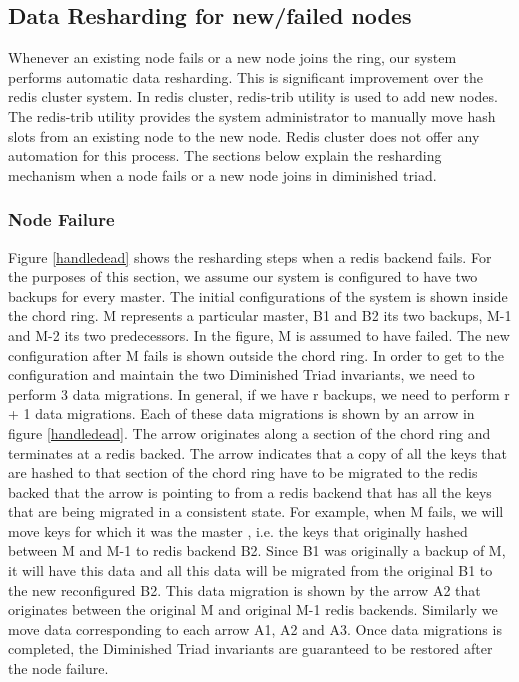 \documentclass[10pt,twocolumn,letterpaper]{article}
\begin{document}
\subsection{Data Resharding for new/failed nodes}

Whenever an existing node fails or a new node joins the ring, our system performs automatic data resharding. This is significant improvement over the redis cluster system. In redis cluster, redis-trib utility is used to add new nodes. The redis-trib utility provides the system administrator to manually move hash slots from an existing node to the new node. Redis cluster does not offer any automation for this process. The sections below explain the resharding mechanism when a node fails or a new node joins in diminished triad. 

\subsubsection{Node Failure} 
Figure \ref{handledead} shows the resharding steps when a redis backend fails. For the purposes of this section, we assume our system is configured to have two backups for every master. The initial configurations of the system is shown inside the chord ring. M represents a particular master, B1 and B2 its two backups, M-1 and M-2 its two predecessors. In the figure, M is assumed to have failed. The new configuration after M fails is shown outside the chord ring. In order to get to the configuration and maintain the two Diminished Triad invariants, we need to perform 3 data migrations. In general, if we have r backups, we need to perform r + 1 data migrations. Each of these data migrations is shown by an arrow in figure \ref{handledead}. The arrow originates along a section of the chord ring and terminates at a redis backed. The arrow indicates that a copy of all the keys that are hashed to that section of the chord ring have to be migrated to the redis backed that the arrow is pointing to from a redis backend that has all the keys that are being migrated in a consistent state. For example, when M fails, we will move keys for which it was the master , i.e. the keys that originally hashed between M and M-1 to redis backend B2. Since B1 was originally a backup of M, it will have this data and all this data will be migrated from the original B1 to the new reconfigured B2. This data migration is shown by the arrow A2 that originates between the original M and original M-1 redis backends. Similarly we move data corresponding to each arrow A1, A2 and A3. Once data migrations is completed, the Diminished Triad invariants are guaranteed to be restored after the node failure.
\end{document}
